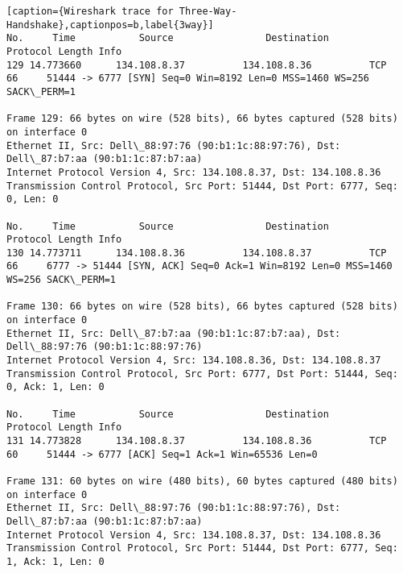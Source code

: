 \begin{lstlisting}[caption={Wireshark trace for Three-Way-Handshake},captionpos=b,label{3way}]
No.     Time           Source                Destination           Protocol Length Info
129 14.773660      134.108.8.37          134.108.8.36          TCP      66     51444 -> 6777 [SYN] Seq=0 Win=8192 Len=0 MSS=1460 WS=256 SACK\_PERM=1

Frame 129: 66 bytes on wire (528 bits), 66 bytes captured (528 bits) on interface 0
Ethernet II, Src: Dell\_88:97:76 (90:b1:1c:88:97:76), Dst: Dell\_87:b7:aa (90:b1:1c:87:b7:aa)
Internet Protocol Version 4, Src: 134.108.8.37, Dst: 134.108.8.36
Transmission Control Protocol, Src Port: 51444, Dst Port: 6777, Seq: 0, Len: 0

No.     Time           Source                Destination           Protocol Length Info
130 14.773711      134.108.8.36          134.108.8.37          TCP      66     6777 -> 51444 [SYN, ACK] Seq=0 Ack=1 Win=8192 Len=0 MSS=1460 WS=256 SACK\_PERM=1

Frame 130: 66 bytes on wire (528 bits), 66 bytes captured (528 bits) on interface 0
Ethernet II, Src: Dell\_87:b7:aa (90:b1:1c:87:b7:aa), Dst: Dell\_88:97:76 (90:b1:1c:88:97:76)
Internet Protocol Version 4, Src: 134.108.8.36, Dst: 134.108.8.37
Transmission Control Protocol, Src Port: 6777, Dst Port: 51444, Seq: 0, Ack: 1, Len: 0

No.     Time           Source                Destination           Protocol Length Info
131 14.773828      134.108.8.37          134.108.8.36          TCP      60     51444 -> 6777 [ACK] Seq=1 Ack=1 Win=65536 Len=0

Frame 131: 60 bytes on wire (480 bits), 60 bytes captured (480 bits) on interface 0
Ethernet II, Src: Dell\_88:97:76 (90:b1:1c:88:97:76), Dst: Dell\_87:b7:aa (90:b1:1c:87:b7:aa)
Internet Protocol Version 4, Src: 134.108.8.37, Dst: 134.108.8.36
Transmission Control Protocol, Src Port: 51444, Dst Port: 6777, Seq: 1, Ack: 1, Len: 0
\end{lstlisting}

